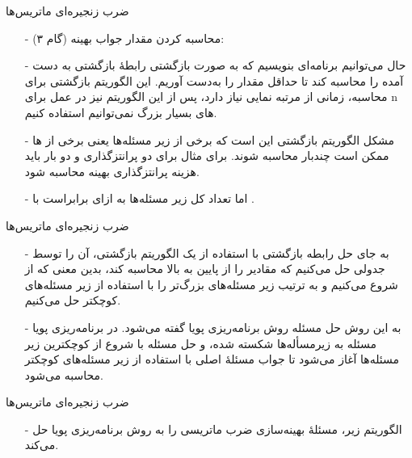 \begin{frame}{‌ضرب زنجیره‌ای ماتریس‌ها}
\begin{itemize}\itemr
\item[-]
(گام ۳) محاسبه کردن مقدار جواب بهینه:
\item[-]
حال می‌توانیم برنامه‌ای بنویسیم که به صورت بازگشتی رابطهٔ بازگشتی به دست آمده را محاسبه کند تا حداقل مقدار
را به‌دست آوریم. این الگوریتم بازگشتی برای محاسبه، زمانی از مرتبه نمایی نیاز دارد، پس از این الگوریتم نیز در عمل برای n های بسیار بزرگ نمی‌توانیم استفاده کنیم.
\item[-]
مشکل الگوریتم بازگشتی این است که برخی از زیر مسئله‌ها یعنی برخی از
‌ها ممکن است چندبار محاسبه شوند.
برای مثال برای دو پرانتزگذاری
و
دو بار باید هزینه پرانتزگذاری بهینه
محاسبه شود.
\item[-]
اما تعداد کل زیر مسئله‌ها به ازای
برابراست با
 .
\iffalse
\item[-]
در واقع تعداد کل جفت‌های i و j هنگامی که برابر نباشند برابر است با 
\m{\binom{n}{2}} . 
اگر i و j برابر باشند، تعداد کل حالات برابر است با 
\m{n} .
\fi
\end{itemize}
\end{frame}


\begin{frame}{‌ضرب زنجیره‌ای ماتریس‌ها}
\begin{itemize}\itemr
\item[-]
به جای حل رابطه بازگشتی با استفاده از یک الگوریتم بازگشتی، آن را توسط جدولی حل می‌کنیم که مقادیر
را از پایین به بالا محاسبه کند، بدین معنی که از
شروع می‌کنیم و به ترتیب زیر مسئله‌های بزرگ‌تر را با استفاده از زیر مسئله‌های کوچکتر حل می‌کنیم.
\item[-]
به این روش حل مسئله
روش برنامه‌ریزی پویا گفته می‌شود.
در برنامه‌ریزی پویا مسئله به زیرمسأله‌ها شکسته شده، و حل مسئله با
 شروع از کوچکترین زیر مسئله‌ها آغاز می‌شود تا جواب مسئلهٔ اصلی با استفاده از زیر مسئله‌های کوچکتر محاسبه می‌شود.
\end{itemize}
\end{frame}


\begin{frame}{‌ضرب زنجیره‌ای ماتریس‌ها}
\begin{itemize}\itemr
\item[-]
الگوریتم زیر، مسئلهٔ بهینه‌سازی ضرب ماتریسی را به روش برنامه‌ریزی پویا حل می‌کند.
\end{itemize}
\end{frame}


